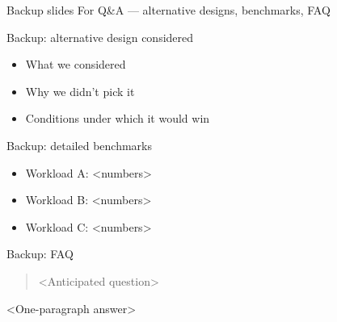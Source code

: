 \documentclass[aspectratio=169,12pt]{beamer}
\begin{document}
\begin{frame}[plain]{Backup slides}
  \vfill
  \centering
  \Large For Q\&A --- alternative designs, benchmarks, FAQ
  \vfill
\end{frame}

\begin{frame}{Backup: alternative design considered}
  \begin{itemize}
    \item What we considered
    \item Why we didn't pick it
    \item Conditions under which it would win
  \end{itemize}
\end{frame}

\begin{frame}{Backup: detailed benchmarks}
  \begin{itemize}
    \item Workload A: <numbers>
    \item Workload B: <numbers>
    \item Workload C: <numbers>
  \end{itemize}
\end{frame}

\begin{frame}{Backup: FAQ}
  \begin{quote}
    <Anticipated question>
  \end{quote}
  <One-paragraph answer>
\end{frame}
\end{document}
